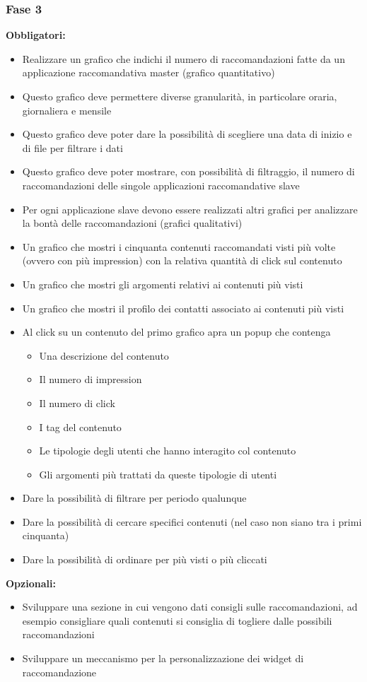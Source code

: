 \documentclass[a4paper, 12pt, twoside, openright]{book}
\begin{document}
\subsubsection{Fase 3}
\textbf{Obbligatori:}
\begin{itemize}
\item Realizzare un grafico che indichi il numero di raccomandazioni fatte da un applicazione raccomandativa master (grafico quantitativo)
\item Questo grafico deve permettere diverse granularità, in particolare oraria, giornaliera e mensile
\item Questo grafico deve poter dare la possibilità di scegliere una data di inizio e di file per filtrare i dati
\item Questo grafico deve poter mostrare, con possibilità di filtraggio, il numero di raccomandazioni delle singole applicazioni raccomandative slave
\item Per ogni applicazione slave devono essere realizzati altri grafici per analizzare la bontà delle raccomandazioni (grafici qualitativi)
\item Un grafico che mostri i cinquanta contenuti raccomandati visti più volte (ovvero con più impression) con la relativa quantità di click sul contenuto 
\item Un grafico che mostri gli argomenti relativi ai contenuti più visti
\item Un grafico che mostri il profilo dei contatti associato ai contenuti più visti
\item Al click su un contenuto del primo grafico apra un popup che contenga 
	\begin{itemize}
	\item Una descrizione del contenuto
	\item Il numero di impression 
	\item Il numero di click
	\item I tag del contenuto
	\item Le tipologie degli utenti che hanno interagito col contenuto
	\item Gli argomenti più trattati da queste tipologie di utenti
	\end{itemize} 
\item Dare la possibilità di filtrare per periodo qualunque
\item Dare la possibilità di cercare specifici contenuti (nel caso non siano tra i primi cinquanta)
\item Dare la possibilità di ordinare per più visti o più cliccati
\end{itemize}
\textbf{Opzionali:}
\begin{itemize}
\item Sviluppare una sezione in cui vengono dati consigli sulle raccomandazioni, ad esempio consigliare quali contenuti si consiglia di togliere dalle possibili raccomandazioni
\item Sviluppare un meccanismo per la personalizzazione dei widget di raccomandazione
\end{itemize}
\end{document}
